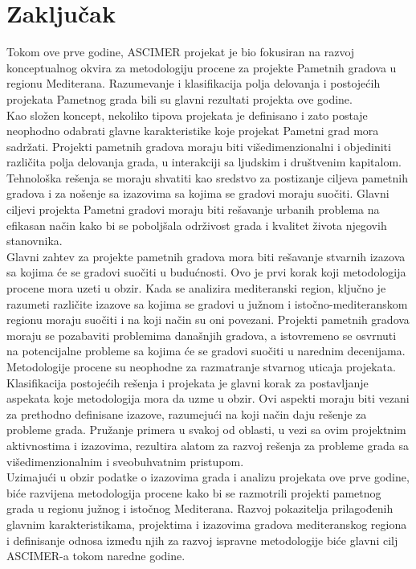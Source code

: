 \documentclass[a4paper,12pt]{article}
\begin{document}
{\section{Zaključak}
\label{sec:zakljucak}
Tokom ove prve godine, ASCIMER projekat je bio fokusiran na razvoj konceptualnog okvira za metodologiju procene za projekte Pametnih gradova u regionu Mediterana. Razumevanje i klasifikacija polja delovanja i postojećih projekata Pametnog grada bili su glavni rezultati projekta ove godine. \\

Kao složen koncept, nekoliko tipova projekata je definisano i zato postaje neophodno odabrati glavne karakteristike koje projekat Pametni grad mora sadržati. Projekti pametnih gradova moraju biti višedimenzionalni i objediniti različita polja delovanja grada, u interakciji sa ljudskim i društvenim kapitalom. Tehnološka rešenja se moraju shvatiti kao sredstvo za postizanje ciljeva pametnih gradova i za nošenje sa izazovima sa kojima se gradovi moraju suočiti. Glavni ciljevi projekta Pametni gradovi moraju biti rešavanje urbanih problema na efikasan način kako bi se poboljšala održivost grada i kvalitet života njegovih stanovnika.\cite{referenca6}  \\

Glavni zahtev za projekte pametnih gradova mora biti rešavanje stvarnih izazova sa kojima će se gradovi suočiti u budućnosti. Ovo je prvi korak koji metodologija procene mora uzeti u obzir. Kada se analizira mediteranski region, ključno je razumeti različite izazove sa kojima se gradovi u južnom i istočno-mediteranskom regionu moraju suočiti i na koji način su oni povezani. Projekti pametnih gradova moraju se pozabaviti problemima današnjih gradova, a istovremeno se osvrnuti na potencijalne probleme sa kojima će se gradovi suočiti u narednim decenijama. \\

Metodologije procene su neophodne za razmatranje stvarnog uticaja projekata. Klasifikacija postojećih rešenja i projekata je glavni korak za postavljanje aspekata koje metodologija mora da uzme u obzir. Ovi aspekti moraju biti vezani za prethodno definisane izazove, razumejući na koji način daju rešenje za probleme grada. Pružanje primera u svakoj od oblasti, u vezi sa ovim projektnim aktivnostima i izazovima, rezultira alatom za razvoj rešenja za probleme grada sa višedimenzionalnim i sveobuhvatnim pristupom. \\

Uzimajući u obzir podatke o izazovima grada i analizu projekata ove prve godine, biće razvijena metodologija procene kako bi se razmotrili projekti pametnog grada u regionu južnog i istočnog Mediterana. Razvoj pokazitelja prilagođenih glavnim karakteristikama, projektima i izazovima gradova mediteranskog regiona i definisanje odnosa između njih za razvoj ispravne metodologije biće glavni cilj ASCIMER-a tokom naredne godine.\\

}
\end{document}
